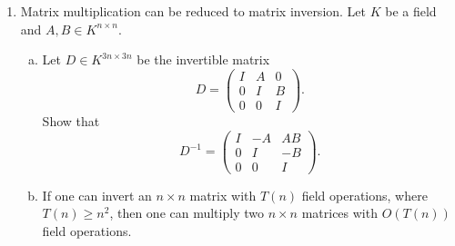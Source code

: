 \begin{enumerate}


\item Matrix multiplication can be reduced to matrix inversion. Let $K$ be a field and $A,B ∈ K^{n × n}$.
  \begin{enumerate}[a)]
  \item 
  Let $D ∈ K^{3n ×3n}$ be the invertible  matrix
  \begin{displaymath}
    D =
    \begin{pmatrix}
      I & A & 0 \\
      0 & I & B \\
      0 & 0 & I
    \end{pmatrix}. 
  \end{displaymath}
  Show that
  \begin{displaymath}
    D^{-1}  =
    \begin{pmatrix}
      I & -A & AB \\
      0 & I & -B \\
      0 & 0 & I
    \end{pmatrix}. 
  \end{displaymath}
\item If one can invert an $n×n$ matrix with $T(n)$ field operations, where $T(n) ≥ n^2$, then one can multiply two $n×n$ matrices with  $O(T(n))$ field operations. 
\end{enumerate}
\end{enumerate}

